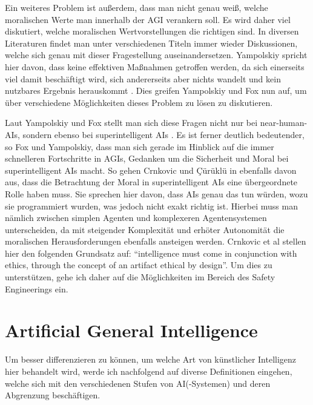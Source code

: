     Ein weiteres Problem ist außerdem, dass man nicht genau weiß, welche moralischen Werte man
    innerhalb der AGI verankern soll. \cite[p. 1]{yampolskiy2013safety} Es wird daher viel 
    diskutiert, welche moralischen Wertvorstellungen die richtigen sind. In diversen Literaturen
    findet man unter verschiedenen Titeln immer wieder Diskussionen, welche sich genau mit dieser
    Fragestellung auseinandersetzen. Yampolskiy spricht hier davon, dass keine effektiven 
    Maßnahmen getroffen werden, da sich einerseits viel damit beschäftigt wird, sich andererseits 
    aber nichts wandelt und kein nutzbares Ergebnis herauskommt \cite[p. 1]{yampolskiy2013safety}.
    Dies greifen Yampolskiy und Fox nun auf, um über verschiedene Möglichkeiten dieses Problem zu
    lösen zu diskutieren. 
    
    Laut Yampolskiy und Fox stellt man sich diese Fragen nicht nur bei near-human-AIs, sondern 
    ebenso bei superintelligent AIs \cite[p. 2]{yampolskiy2013safety}. Es ist ferner deutlich 
    bedeutender, so Fox und Yampolskiy, dass man sich gerade im Hinblick auf die immer schnelleren
    Fortschritte in AGIs, Gedanken um die Sicherheit und Moral bei superintelligent AIs macht. 
    So gehen Crnkovic und {\c{C}}{\"u}r{\"u}kl{\"u} in \cite[p. 1]{crnkovic2012robots} ebenfalls
    davon aus, dass die Betrachtung der Moral in superintelligent AIs eine übergeordnete Rolle 
    haben muss. Sie sprechen hier davon, dass AIs genau das tun würden, wozu sie programmiert 
    wurden, was jedoch nicht exakt richtig ist. Hierbei muss man nämlich zwischen simplen Agenten 
    und komplexeren Agentensystemen unterscheiden, da mit steigender Komplexität und erhöter 
    Autonomität die moralischen Herausforderungen ebenfalls ansteigen werden. Crnkovic et al
    stellen hier den folgenden Grundsatz auf: ``intelligence must come in conjunction with ethics,
    through the concept of an artifact ethical by design''. Um dies zu unterstützen, gehe ich daher
    auf die Möglichkeiten im Bereich des Safety Engineerings ein.
    
\section{Artificial General Intelligence}
    Um besser differenzieren zu können, um welche Art von künstlicher Intelligenz hier behandelt 
    wird, werde ich nachfolgend auf diverse Definitionen eingehen, welche sich mit den verschiedenen
    Stufen von AI(-Systemen) und deren Abgrenzung beschäftigen. 
    
